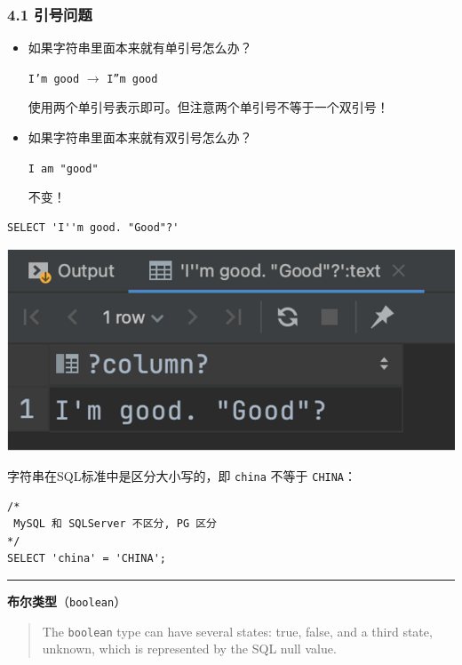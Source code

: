 \documentclass[aspectratio=169, 14pt]{beamer}
\begin{document}
\begin{frame}
    \frametitle{4.1 引号问题}
\begin{itemize}
    \item<1-> 如果字符串里面本来就有单引号怎么办？
    
    \texttt{I'm good} $\rightarrow$ \texttt{I''m good}

    使用两个单引号表示即可。但注意\alert{两个单引号不等于一个双引号}！
    \item<2-> 如果字符串里面本来就有双引号怎么办？
    
    \texttt{I am "good"}

    不变！
\end{itemize}
    
\end{frame}

\begin{frame}[fragile]
    \begin{verbatim} 
SELECT 'I''m good. "Good"?'
    \end{verbatim}

    \includegraphics[height=.6\paperheight]{week4/good}    
\end{frame}

\begin{frame}[fragile]
    字符串在SQL标准中是区分大小写的，即 \texttt{china} 不等于 \texttt{CHINA}：
\begin{verbatim} 
/*
 MySQL 和 SQLServer 不区分, PG 区分
*/
SELECT 'china' = 'CHINA';
\end{verbatim}
    \pause
\noindent\rule{\textwidth}{1pt}
\textbf{布尔类型}（\texttt{boolean}）
\begin{quote}
    The \texttt{boolean} type can have several states: \alert{true}, \alert{false}, and a third state, \alert{unknown}, which is represented by the SQL \alert{null} value.
\end{quote}

\end{frame}
\end{document}
